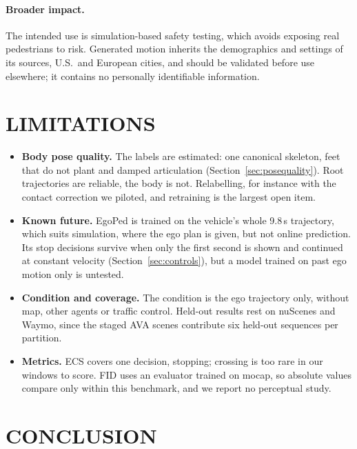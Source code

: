 \documentclass{ieeeoj}
\newcommand{\method}{EgoPed\xspace}
\begin{document}
\paragraph{Broader impact.}
The intended use is simulation-based safety testing, which avoids exposing real pedestrians to risk. Generated motion inherits the demographics and settings of its sources, U.S.\ and European cities, and should be validated before use elsewhere; it contains no personally identifiable information.

\section{LIMITATIONS}
\label{sec:limitations}

\begin{itemize}
  \item \textbf{Body pose quality.} The labels are estimated: one canonical skeleton, feet that do not plant and damped articulation (Section~\ref{sec:posequality}). Root trajectories are reliable, the body is not. Relabelling, for instance with the contact correction we piloted, and retraining is the largest open item.
  \item \textbf{Known future.} \method is trained on the vehicle's whole 9.8\,s trajectory, which suits simulation, where the ego plan is given, but not online prediction. Its stop decisions survive when only the first second is shown and continued at constant velocity (Section~\ref{sec:controls}), but a model trained on past ego motion only is untested.
  \item \textbf{Condition and coverage.} The condition is the ego trajectory only, without map, other agents or traffic control. Held-out results rest on nuScenes and Waymo, since the staged AVA scenes contribute six held-out sequences per partition.
  \item \textbf{Metrics.} ECS covers one decision, stopping; crossing is too rare in our windows to score. FID uses an evaluator trained on mocap, so absolute values compare only within this benchmark, and we report no perceptual study.
\end{itemize}

\section{CONCLUSION}
\end{document}
